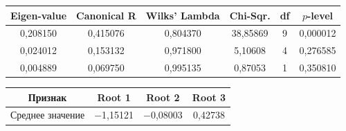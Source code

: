 \begin{table}\small %

\begin{center}


\label{tab4}

\vspace*{2ex}



\begin{tabular}{|c|c|c|c|c|c|}

\hline

{Eigen-value} & {Canonical R} & {Wilks' Lambda} & {Chi-Sqr.} & {df} & {$p$-level}\\ 

\hline

0,208150 & 0,415076 & 0,804370 & 38,85869\hphantom{8} & 9 & 0,000012 \\

0,024012 & 0,153132 & 0,971800 & 5,10608 & 4 & 0,276585\\

0,004889 & 0,069750 & 0,995135 & 0,87053 & 1 & 0,350810\\ 

\hline

\end{tabular}

\end{center}



\begin{center}


\label{tab5}

\vspace*{2ex}



\begin{tabular}{|l|c|c|c|}

\hline

\multicolumn{1}{|c|}{Признак} & {Root 1} & {Root 2} & {Root 3}\\ 

\hline

Среднее значение& $-$1,15121\hphantom{$-$} & $-$0,08003\hphantom{$-$} & 0,42738 \\


\end{tabular}
\end{center}
\end{table}
